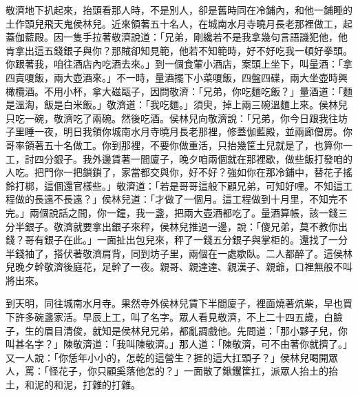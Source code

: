 \begin{showcontents}{}
敬濟地下扒起來，抬頭看那人時，不是別人，卻是舊時同在冷鋪內，和他一鋪睡的土作頭兒飛天鬼侯林兒。近來領著五十名人，在城南水月寺曉月長老那裡做工，起蓋伽藍殿。因一隻手拉著敬濟說道：「兄弟，剛纔若不是我拿幾句言語譏犯他，他肯拿出這五錢銀子與你？那賊卻知見範，他若不知範時，好不好吃我一頓好拳頭。你跟著我，咱往酒店內吃酒去來。」到一個食葷小酒店，案頭上坐下，叫量酒：「拿四賣嗄飯，兩大壺酒來。」不一時，量酒擺下小菜嗄飯，四盤四碟，兩大坐壺時興橄欖酒。不用小杯，拿大磁甌子，因問敬濟：「兄弟，你吃麵吃飯？」量酒道：「麵是溫淘，飯是白米飯。」敬濟道：「我吃麵。」須臾，掉上兩三碗溫麵上來。侯林兒只吃一碗，敬濟吃了兩碗。然後吃酒。侯林兒向敬濟說：「兄弟，你今日跟我往坊子里睡一夜，明日我領你城南水月寺曉月長老那裡，修蓋伽藍殿，並兩廊僧房。你哥率領著五十名做工。你到那裡，不要你做重活，只抬幾筐土兒就是了，也算你一工，討四分銀子。我外邊賃著一間廈子，晚夕咱兩個就在那裡歇，做些飯打發咱的人吃。把門你一把鎖鎖了，家當都交與你，好不好？強如你在那冷鋪中，替花子搖鈴打梆，這個還官樣些。」敬濟道：「若是哥哥這般下顧兄弟，可知好哩。不知這工程做的長遠不長遠？」侯林兒道：「才做了一個月。這工程做到十月里，不知完不完。」兩個說話之間，你一鐘，我一盞，把兩大壺酒都吃了。量酒算帳，該一錢三分半銀子。敬濟就要拿出銀子來秤，侯林兒推過一邊，說：「傻兄弟，莫不教你出錢？哥有銀子在此。」一面扯出包兒來，秤了一錢五分銀子與掌柜的。還找了一分半錢袖了，搭伏著敬濟肩背，同到坊子里，兩個在一處歇臥。二人都醉了。這侯林兒晚夕幹敬濟後庭花，足幹了一夜。親哥、親達達、親漢子、親爺，口裡無般不叫將出來。

到天明，同往城南水月寺。果然寺外侯林兒賃下半間廈子，裡面燒著炕柴，早也買下許多碗盞家活。早辰上工，叫了名字。眾人看見敬濟，不上二十四五歲，白臉子，生的眉目清俊，就知是侯林兒兄弟，都亂調戲他。先問道：「那小夥子兒，你叫甚名字？」陳敬濟道：「我叫陳敬濟。」那人道：「陳敬濟，可不由著你就擠了。」又一人說：「你恁年小小的，怎乾的這營生？捱的這大扛頭子？」侯林兒喝開眾人，罵：「怪花子，你只顧奚落他怎的？」一面散了鍬钁筐扛，派眾人抬土的抬土，和泥的和泥，打雜的打雜。


\end{showcontents}
